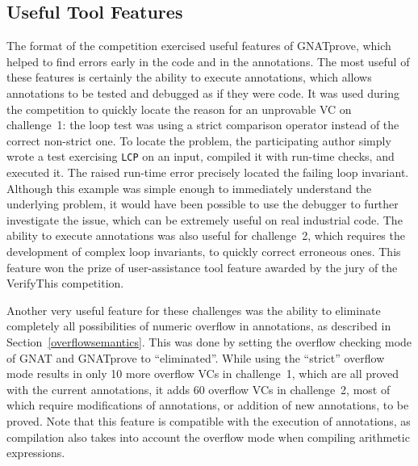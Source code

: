 \documentclass[sttt,final]{svjour}
\newcommand{\gnatprove}{GNATprove\xspace}
\begin{document}

\subsection{Useful Tool Features}

The format of the competition exercised useful features of \gnatprove,
which helped to find errors early in the code and in the
annotations. The most useful of these features is certainly the
ability to execute annotations, which allows annotations to be tested
and debugged as if they were code. It was used during the competition
to quickly locate the reason for an unprovable VC on challenge~1: the
loop test was using a strict comparison operator instead of the
correct non-strict one. To locate the problem, the participating
author simply wrote a test exercising \verb|LCP| on an input, compiled
it with run-time checks, and executed it. The raised run-time error
precisely located the failing loop invariant. Although this example
was simple enough to immediately understand the underlying problem, it
would have been possible to use the debugger to further investigate
the issue, which can be extremely useful on real industrial code. The
ability to execute annotations was also useful for challenge~2, which
requires the development of complex loop invariants, to quickly
correct erroneous ones. This feature won the prize of user-assistance
tool feature awarded by the jury of the VerifyThis competition.

Another very useful feature for these challenges was the ability to
eliminate completely all possibilities of numeric overflow in
annotations, as described in Section~\ref{overflowsemantics}. This was
done by setting the overflow checking mode of GNAT and
\gnatprove to ``eliminated''. While using the ``strict'' overflow mode
results in only 10 more overflow VCs in challenge~1, which are all
proved with the current annotations, it adds 60 overflow VCs in
challenge~2, most of which require modifications of annotations, or
addition of new annotations, to be proved. Note that this feature is
compatible with the execution of annotations, as compilation also
takes into account the overflow mode when compiling arithmetic
expressions.
\end{document}
